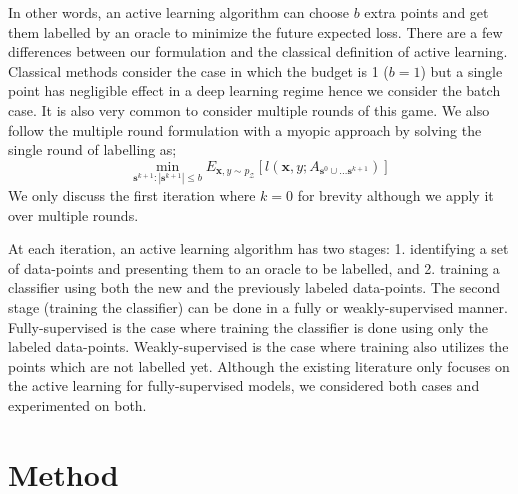 \documentclass{article} %
\begin{document}
In other words, an active learning algorithm can choose $b$ extra points and get them labelled by an oracle to minimize
the future expected loss. There are a few differences between our formulation and the classical definition of active
learning. Classical methods consider the case in which the budget is 1 ($b=1$) but a single point has negligible effect
in a deep learning regime hence we consider the batch case. It is also very common to consider multiple rounds of this
game. %
We also follow the multiple round formulation with a myopic approach by solving the single round of labelling as;
\begin{equation} \min_{\mathbf{s}^{k+1} : |\mathbf{s}^{k+1}| \leq b} E_{\mathbf{x},y \sim p_\mathcal{Z}}
[l(\mathbf{x},y;A_{\mathbf{s}^{0} \cup \ldots  \mathbf{s}^{k+1}})] \end{equation}
We only discuss the first iteration where $k=0$ for brevity although we apply it over multiple rounds. 

At each iteration, an active learning algorithm has two stages: 1. identifying a set of data-points and presenting them
to an oracle to be labelled, and 2. training a classifier using both the new and the previously labeled data-points. The
second stage (training the classifier) can be done in a fully or weakly-supervised manner. Fully-supervised is the case
where training the classifier is done using only the labeled data-points. Weakly-supervised is the case where training
also utilizes the points which are not labelled yet. Although the existing literature only focuses on the active
learning for fully-supervised models, we considered both cases and experimented on both. 

\section{Method}
\end{document}
